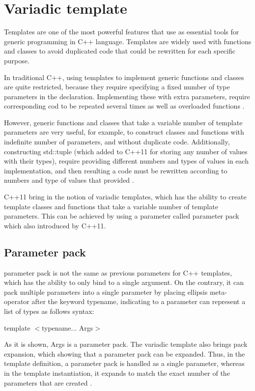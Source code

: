 \documentclass[11pt]{report}
\begin{document}
\section{Variadic template}
\label{section: Variadic template}
Templates are one of the most powerful features that use as essential tools for generic programming in C++ language. Templates are widely used with functions and classes to avoid duplicated code that could be rewritten for each specific purpose.


In traditional C++, using templates to implement generic functions and classes are quite restricted, because they require specifying a fixed number of type parameters in the declaration. Implementing these with extra parameters, require corresponding cod to be repeated several times as well as overloaded functions \cite{Stroustrup:2012:Cpp11}.


However, generic functions and classes that take a variable number of template parameters are very useful, for example, to construct classes and functions with indefinite number of parameters, and without duplicate code. Additionally, constructing std::tuple (which added to C++11 for storing any number of values with their types), require providing different numbers and types of values in each implementation, and then resulting a code must be rewritten according to numbers and type of values that provided \cite{Stroustrup:2012:Cpp11}.


C++11 bring in the notion of variadic templates, which has the ability to create template classes and functions that take a variable number of template parameters. This can be achieved by using a parameter called parameter pack which also introduced by C++11.


\subsection{Parameter pack}
\label{subsection: Parameter pack}
parameter pack is not the same as previous parameters for C++ templates, which has the ability to only bind to a single argument. On the contrary, it can pack multiple parameters into a single parameter by placing ellipsis meta-operator after the keyword typename, indicating to a parameter can represent a list of types as follows syntax:
\begin{center}
template $<$typename... Args$>$
\end{center}

As it is shown, Args is a parameter pack. The variadic template also brings pack expansion, which showing that a parameter pack can be expanded. Thus, in the template definition, a parameter pack is handled as a single parameter, whereas in the template instantiation, it expands to match the exact number of the parameters that are created \cite{Gregorie:professionalcpp}.
\end{document}
